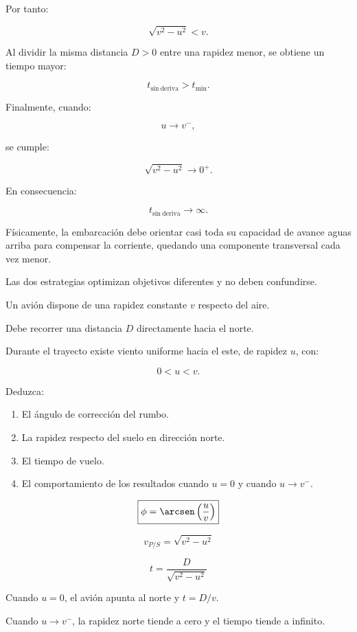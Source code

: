 \begin{explicacion}
Por tanto:

\[
\sqrt{v^2-u^2}<v.
\]

Al dividir la misma distancia \(D>0\)
entre una rapidez menor, se obtiene
un tiempo mayor:

\[
\boxed{
t_{\mathrm{sin\ deriva}}>t_{\min}
}.
\]

Finalmente, cuando:

\[
u\to v^{-},
\]

se cumple:

\[
\sqrt{v^2-u^2}\to0^{+}.
\]

En consecuencia:

\[
\boxed{
t_{\mathrm{sin\ deriva}}\to\infty
}.
\]

Físicamente, la embarcación debe orientar
casi toda su capacidad de avance aguas arriba
para compensar la corriente, quedando una
componente transversal cada vez menor.

Las dos estrategias optimizan objetivos
diferentes y no deben confundirse.
\end{explicacion}


\begin{ejercicio}
Un avión dispone de una rapidez constante
\(v\) respecto del aire.

Debe recorrer una distancia \(D\)
directamente hacia el norte.

Durante el trayecto existe viento
uniforme hacia el este, de rapidez \(u\),
con:

\[
0<u<v.
\]

Deduzca:

\begin{enumerate}[label=\alph*)]
    \item El ángulo de corrección del rumbo.
    \item La rapidez respecto del suelo
    en dirección norte.
    \item El tiempo de vuelo.
    \item El comportamiento de los resultados
    cuando \(u=0\) y cuando \(u\to v^{-}\).
\end{enumerate}
\end{ejercicio}

\begin{respuesta}
\[
\boxed{
\phi=\arcsen\left(\frac{u}{v}\right)
}
\]

\[
\boxed{
v_{P/S}=\sqrt{v^2-u^2}
}
\]

\[
\boxed{
t=\frac{D}{\sqrt{v^2-u^2}}
}
\]

Cuando \(u=0\), el avión apunta al norte
y \(t=D/v\).

Cuando \(u\to v^{-}\), la rapidez norte
tiende a cero y el tiempo tiende a infinito.
\end{respuesta}

